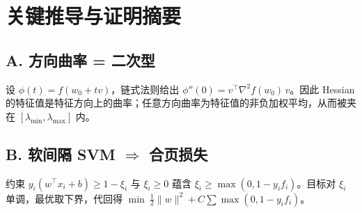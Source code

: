 \documentclass[10.5pt,hyperref,a4paper,UTF8]{ctexart}
\theoremstyle{definition}
\begin{document}
\section{关键推导与证明摘要}

\subsection*{A. 方向曲率 = 二次型}
设 $\phi(t)=f(w_0+t v)$，链式法则给出 $\phi''(0)=v^\top \nabla^2 f(w_0)\,v$。因此 Hessian 的特征值是特征方向上的曲率；任意方向曲率为特征值的非负加权平均，从而被夹在 $[\lambda_{\min},\lambda_{\max}]$ 内。

\subsection*{B. 软间隔 SVM $\Rightarrow$ 合页损失}
约束 $y_i(w^\top x_i+b)\ge 1-\xi_i$ 与 $\xi_i\ge 0$ 蕴含 $\xi_i\ge \max(0,1-y_if_i)$。目标对 $\xi_i$ 单调，最优取下界，代回得 $\min\ \tfrac12\lVert w\rVert^2+C\sum \max(0,1-y_if_i)$。





\newpage
{}
\end{document}
